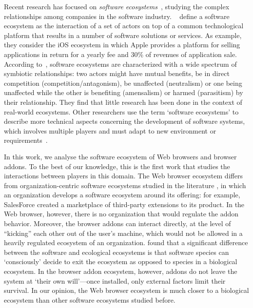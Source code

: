 \documentclass[ijoc,nonblindrev]{informs3} %
\numberwithin{equation}{subsection}
\begin{document}
Recent research has focused on \emph{software ecosystems}~\citep{messerschmitt2005software,dhungana2010software,manikas13,jansen13}, studying the complex relationships among companies in the software industry. ~\cite{manikas13} define a software ecosystem as the interaction of a set of actors on top of a common technological platform that results in a number of software solutions or services. As example, they consider the iOS ecosystem in which Apple provides a platform for selling applications in return for a yearly fee and 30\% of revenues of application sale. According to~\cite{manikas13}, software ecosystems are characterized with a wide spectrum of symbiotic relationships: two actors might have mutual benefits, be in direct competition (competition/antagonism), be unaffected (neutralism) or one being unaffected while the other is benefiting (amensalism) or harmed (parasitism) by their relationship. They find that little research has been done in the context of real-world ecosystems. Other researchers use the term `software ecosystems' to describe more technical aspects concerning the development of software systems, which involves multiple players and must adapt to new environment or requirements~\citep{lunguPhd09,blincoeMSR15}. 

In this work, we analyse the software ecosystem of Web browsers and browser addons. To the best of our knowledge, this is the first work that studies the interactions between players in this domain. The Web browser ecosystem differs from organization-centric software ecosystems studied in the literature \citep{christensen2014analysis}, in which an organization develops a software ecosystem around its offering: for example, SalesForce \citep{jansen2013defining} created a marketplace of third-party extensions to its product. In the Web browser, however, there is no organization that would regulate the addon behavior. Moreover, the browser addons can interact directly, at the level of ``kicking'' each other out of the user's machine, which would not be allowed in a heavily regulated ecosystem of an organization. \cite{jansen2013defining} found that a significant difference between the software and ecological ecosystems is that software species can `consciously' decide to exit the ecosystem as opposed to species in a biological ecosystem. In the browser addon ecosystem, however, addons do not leave the system at `their own will'---once installed, only external factors limit their survival. In our opinion, the Web browser ecosystem is much closer to a biological ecosystem than other software ecosystems studied before. 
\end{document}
